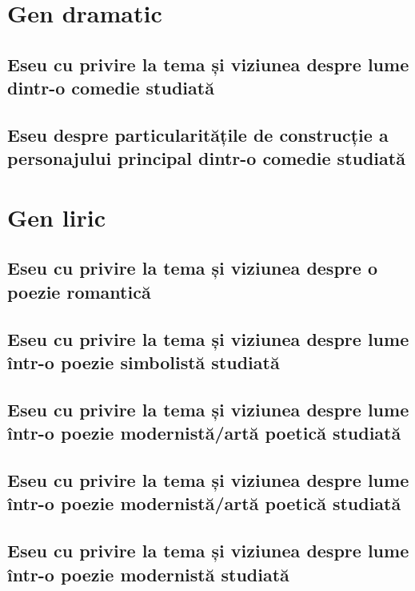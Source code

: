 \documentclass[
 12pt,                       %
 a4paper                     %
]{book}
\begin{document}
\part{Gen dramatic}


\chapter{Eseu cu privire la tema și viziunea despre lume dintr-o comedie studiată}


\chapter{Eseu despre particularitățile de construcție a personajului principal dintr-o comedie studiată}




\part{Gen liric}


\chapter{Eseu cu privire la tema și viziunea despre o poezie romantică}



\chapter{Eseu cu privire la tema și viziunea despre lume într-o poezie simbolistă studiată}



\chapter{Eseu cu privire la tema și viziunea despre lume într-o poezie modernistă/artă poetică studiată}



\chapter{Eseu cu privire la tema și viziunea despre lume într-o poezie modernistă/artă poetică studiată}



\chapter{Eseu cu privire la tema și viziunea despre lume într-o poezie modernistă studiată}

\end{document}
